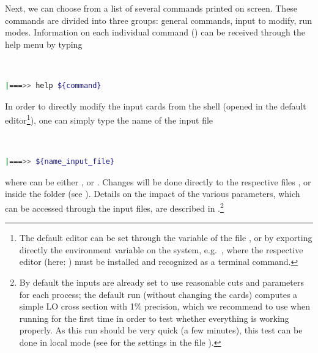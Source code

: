 \documentclass[english,11pt]{article}
\begin{document}
Next, we can choose from a list of several commands printed on screen. These commands are divided into three 
groups: general commands, input to modify, run modes. Information on each individual command () can be received through 
the help menu by typing
{\tt
\begin{lstlisting}[language=bash]
 |===>> help ${command}
\end{lstlisting}
}%
In order to directly modify the input cards from the shell (opened in the default editor\footnote{The default editor can be set through the  variable of the file , or by exporting directly the  environment variable on the system, e.g.\ , where the respective editor (here: ) must be installed and recognized as a terminal command.}), one can simply type the name of the input file
{\tt
\begin{lstlisting}[language=bash]
 |===>> ${name_input_file}
\end{lstlisting}
}%
where  can be either ,  or . Changes will be done directly 
to the respective files ,  or  inside the folder  (see ). Details on the impact of the various parameters, which can be accessed through the input files, are described in .\footnote{By default the inputs are already set to use reasonable 
cuts and parameters for each process; the default run (without changing the cards) 
computes a simple LO cross section with 1\% precision, which we recommend to use 
when running for the first time in order to test whether everything is working 
properly. As this run should be very quick (a few minutes), this test can be done 
in local mode (see  for the settings in the file ).}
\end{document}
